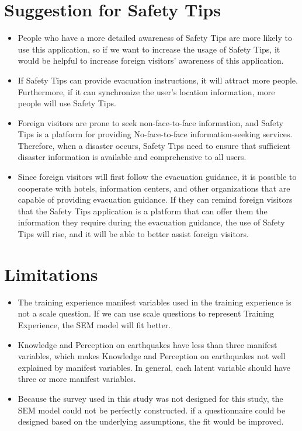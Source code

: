 \section{Suggestion for Safety Tips}
\begin{itemize}
\item People who have a more detailed awareness of Safety Tips are more likely to use this application, so if we want to increase the usage of Safety Tips, it would be helpful to increase foreign visitors' awareness of this application.
\item If Safety Tips can provide evacuation instructions, it will attract more people. Furthermore, if it can synchronize the user's location information, more people will use Safety Tips.
\item Foreign visitors are prone to seek non-face-to-face information, and Safety Tips is a platform for providing No-face-to-face information-seeking services. Therefore, when a disaster occurs, Safety Tips need to ensure that sufficient disaster information is available and comprehensive to all users.
\item Since foreign visitors will first follow the evacuation guidance, it is possible to cooperate with hotels, information centers, and other organizations that are capable of providing evacuation guidance. If they can remind foreign visitors that the Safety Tips application is a platform that can offer them the information they require during the evacuation guidance, the use of Safety Tips will rise, and it will be able to better assist foreign visitors.
\end{itemize}

\section{Limitations}
\begin{itemize}
\item The training experience manifest variables used in the training experience is not a scale question. If we can use scale questions to represent Training Experience, the SEM model will fit better.
\item Knowledge and Perception on earthquakes have less than three manifest variables, which makes Knowledge and Perception on earthquakes not well explained by manifest variables. In general, each latent variable should have three or more manifest variables.
\item Because the survey used in this study was not designed for this study, the SEM model could not be perfectly constructed. if a questionnaire could be designed based on the underlying assumptions, the fit would be improved.
\end{itemize}


















